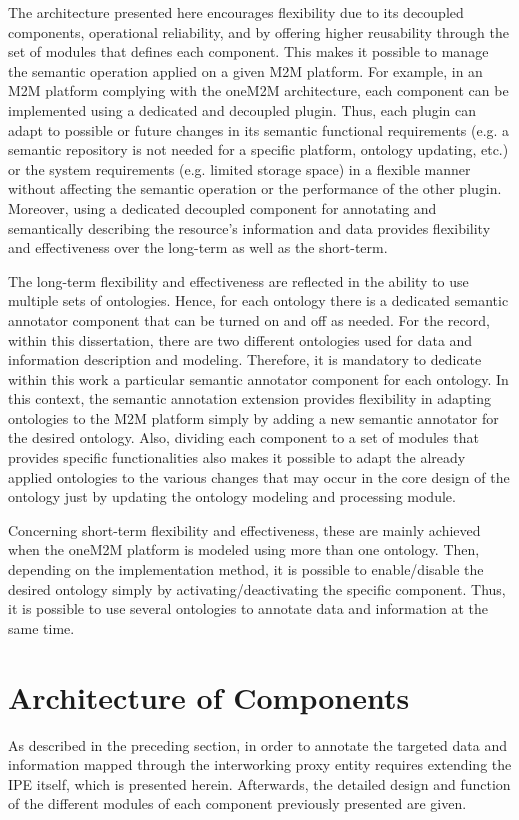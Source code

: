 The architecture presented here encourages flexibility due to its decoupled components, operational reliability, and by offering higher reusability through the set of modules that defines each component. This makes it possible to manage the semantic operation applied on a given M2M platform. For example, in an M2M platform complying with the oneM2M architecture, each component can be implemented using a dedicated and decoupled plugin. Thus, each plugin can adapt to possible or future changes in its semantic functional requirements (e.g. a semantic repository is not needed for a specific platform, ontology updating, etc.) or the system requirements (e.g. limited storage space) in a flexible manner without affecting the semantic operation or the performance of the other plugin. Moreover, using a dedicated decoupled component for annotating and semantically describing the resource’s information and data provides flexibility and effectiveness over the long-term as well as the short-term. \par
The long-term flexibility and effectiveness are reflected in the ability to use multiple sets of ontologies. Hence, for each ontology there is a dedicated semantic annotator component that can be turned on and off as needed. For the record, within this dissertation, there are two different ontologies used for data and information description and modeling. Therefore, it is mandatory to dedicate within this work a particular semantic annotator component for each ontology. In this context, the semantic annotation extension provides flexibility in adapting ontologies to the M2M platform simply by adding a new semantic annotator for the desired ontology. Also, dividing each component to a set of modules that provides specific functionalities also makes it possible to adapt the already applied ontologies to the various changes that may occur in the core design of the ontology just by updating the ontology modeling and processing module.    \par
Concerning short-term flexibility and effectiveness, these are mainly achieved when the oneM2M platform is modeled using more than one ontology. Then, depending on the implementation method, it is possible to enable/disable the desired ontology simply by activating/deactivating the specific component. Thus, it is possible to use several ontologies to annotate data and information at the same time. \par

\section{Architecture of Components }
As described in the preceding section, in order to annotate the targeted data and information mapped through the interworking proxy entity requires extending the IPE itself, which is presented herein. Afterwards, the detailed design and function of the different modules of each component previously presented are given.
